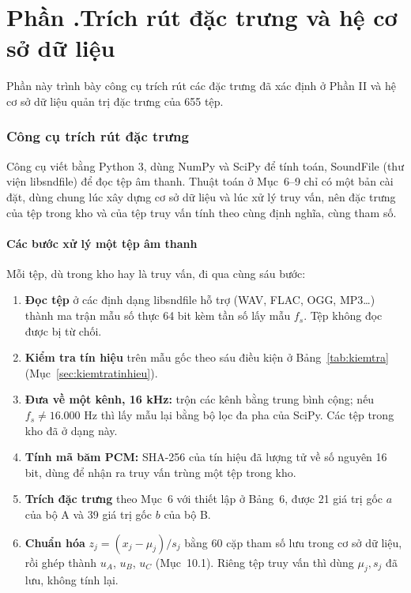 \documentclass[11pt,a4paper]{article}
\newcommand{\phan}[1]{\clearpage\refstepcounter{part}\part*{Phần \thepart.\texorpdfstring{\enspace}{ }#1}}
\begin{document}
\setcounter{part}{2}\setcounter{section}{13}\setcounter{table}{11}\setcounter{figure}{2}
\phan{Trích rút đặc trưng và hệ cơ sở dữ liệu}
Phần này trình bày công cụ trích rút các đặc trưng đã xác định ở Phần II và hệ cơ sở dữ liệu quản trị đặc trưng của 655 tệp.

\section{Công cụ trích rút đặc trưng}\label{sec:congcu}
Công cụ viết bằng Python 3, dùng NumPy và SciPy để tính toán, SoundFile (thư viện libsndfile) để đọc tệp âm thanh. Thuật toán ở Mục~6--9 chỉ có một bản cài đặt, dùng chung lúc xây dựng cơ sở dữ liệu và lúc xử lý truy vấn, nên đặc trưng của tệp trong kho và của tệp truy vấn tính theo cùng định nghĩa, cùng tham số.

\subsection{Các bước xử lý một tệp âm thanh}\label{sec:buocxuly}
Mỗi tệp, dù trong kho hay là truy vấn, đi qua cùng sáu bước:
\begin{enumerate}
\item \textbf{Đọc tệp} ở các định dạng libsndfile hỗ trợ (WAV, FLAC, OGG, MP3\ldots) thành ma trận mẫu số thực 64 bit kèm tần số lấy mẫu $f_s$. Tệp không đọc được bị từ chối.
\item \textbf{Kiểm tra tín hiệu} trên mẫu gốc theo sáu điều kiện ở Bảng~\ref{tab:kiemtra} (Mục~\ref{sec:kiemtratinhieu}).
\item \textbf{Đưa về một kênh, 16 kHz:} trộn các kênh bằng trung bình cộng; nếu $f_s\ne16.000$ Hz thì lấy mẫu lại bằng bộ lọc đa pha của SciPy. Các tệp trong kho đã ở dạng này.
\item \textbf{Tính mã băm PCM:} SHA-256 của tín hiệu đã lượng tử về số nguyên 16 bit, dùng để nhận ra truy vấn trùng một tệp trong kho.
\item \textbf{Trích đặc trưng} theo Mục~6 với thiết lập ở Bảng~6, được 21 giá trị gốc $a$ của bộ A và 39 giá trị gốc $b$ của bộ B.
\item \textbf{Chuẩn hóa} $z_j=(x_j-\mu_j)/s_j$ bằng 60 cặp tham số lưu trong cơ sở dữ liệu, rồi ghép thành $u_A$, $u_B$, $u_C$ (Mục~10.1). Riêng tệp truy vấn thì dùng $\mu_j, s_j$ đã lưu, không tính lại.
\end{enumerate}
\end{document}
